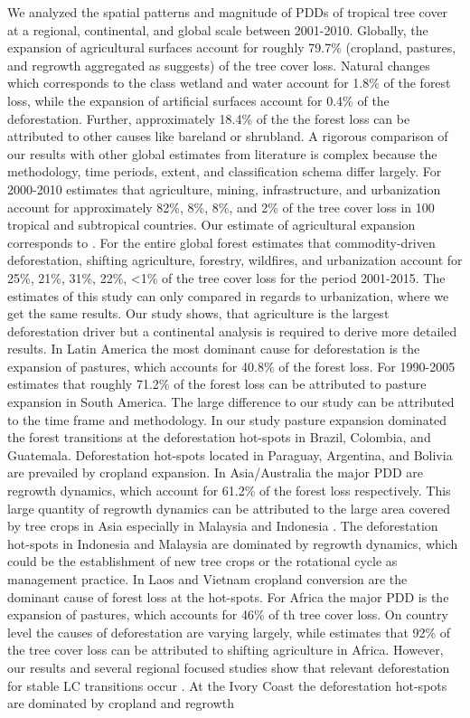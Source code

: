 		We analyzed the spatial patterns and magnitude of \acp{PDD} of tropical tree cover at a regional, continental, and global scale between 2001-2010. Globally, the expansion of agricultural surfaces account for roughly 79.7\% (cropland, pastures, and regrowth aggregated as \citet{Geist2001} suggests) of the tree cover loss. Natural changes which corresponds to the class wetland and water account for 1.8\% of the forest loss, while the expansion of artificial surfaces account for 0.4\% of the deforestation. Further, approximately 18.4\% of the the forest loss can be attributed to other causes like bareland or shrubland. A rigorous comparison of our results with other global estimates from literature is complex because the methodology, time periods, extent, and classification schema differ largely. For 2000-2010 \citet{Hosonuma2012} estimates that agriculture, mining, infrastructure, and urbanization account for approximately 82\%, 8\%, 8\%, and 2\% of the tree cover loss in 100 tropical and subtropical countries. Our estimate of agricultural expansion corresponds to \citeauthor{Hosonuma2012}. For the entire global forest \citet{Curtis2018} estimates that commodity-driven deforestation, shifting agriculture, forestry, wildfires, and urbanization account for 25\%, 21\%, 31\%, 22\%, <1\% of the tree cover loss for the period 2001-2015. The estimates of this study can only compared in regards to urbanization, where we get the same results. Our study shows, that agriculture is the largest deforestation driver but a continental analysis is required to derive more detailed results. In Latin America the most dominant cause for deforestation is the expansion of pastures, which accounts for 40.8\% of the forest loss. For 1990-2005 \citet{Sy2015} estimates that roughly 71.2\% of the forest loss can be attributed to pasture expansion in South America. The large difference to our study can be attributed to the time frame and methodology. In our study pasture expansion dominated the forest transitions at the deforestation hot-spots in Brazil, Colombia, and Guatemala. Deforestation hot-spots located in Paraguay, Argentina, and Bolivia are prevailed by cropland expansion. In Asia/Australia the major \ac{PDD} are regrowth dynamics, which account for 61.2\% of the forest loss respectively. This large quantity of regrowth dynamics can be attributed to the large area covered by tree crops in Asia especially in Malaysia and Indonesia \citep{Corley2016,Austin2019}. The deforestation hot-spots in Indonesia and Malaysia are dominated by regrowth dynamics, which could be the establishment of new tree crops or the rotational cycle as management practice. In Laos and Vietnam cropland conversion are the dominant cause of forest loss at the hot-spots. For Africa the major \ac{PDD} is the expansion of pastures, which accounts for 46\% of th tree cover loss. On country level the causes of deforestation are varying largely, while \citet{Curtis2018} estimates that 92\% of the tree cover loss can be attributed to shifting agriculture in Africa. However, our results and several regional focused studies show that relevant deforestation for stable \ac{LC} transitions occur \citep{Ruf2014,Kideghesho2015,Barima2016,Folefack2019}. At the Ivory Coast the deforestation hot-spots are dominated by cropland and regrowth 
